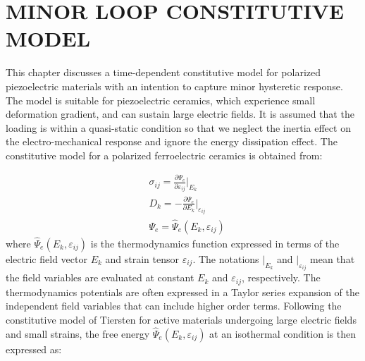 %
%
%


\chapter{\uppercase{minor loop constitutive model}}  
\label{section:minor_loop_constitutive_model_for_polarized_piezo_electric}
This chapter discusses a time-dependent constitutive model for polarized piezoelectric materials with an intention to capture minor hysteretic response.
The model is suitable for piezoelectric ceramics, which experience small deformation gradient, and can sustain large electric fields. 
It is assumed that the loading is within a quasi-static condition so that we neglect the inertia effect on the electro-mechanical response and ignore the energy dissipation effect. 
The constitutive model for a polarized ferroelectric ceramics is obtained from:


\begin{equation}
\begin{aligned}
&\sigma _{ij} = \frac{\partial \Psi_e}{\partial \varepsilon_{ij}}\vert _{E_{k}}
\\
& D_k = -\frac{\partial \Psi_e}{\partial E_k}\vert _{\varepsilon_{ij}}\\
& \Psi_e= \hat{\Psi}_e(E_k,\varepsilon_{ij})
\end{aligned}
\label{EQN:Derivation_from_gibbs}
\end{equation}
where $\hat{\Psi}_e(E_k,\varepsilon_{ij})$ is the thermodynamics function expressed in terms of the electric field vector $E_k$ and strain tensor $\varepsilon_{ij}$. 
The notations $\vert _{E_{k}}$ and $\vert _{\varepsilon_{ij}}$ mean that the field variables are evaluated at constant $E_{k}$ and $\varepsilon_{ij}$, respectively.
The thermodynamics potentials are often expressed in a Taylor series expansion of the independent field variables that can include higher order terms. 
Following the constitutive model of Tiersten \cite{tiersten1993electroelastic}
for active materials undergoing large electric fields and small strains, 
the free energy $\hat{\Psi}_e(E_k,\varepsilon_{ij})$ at an isothermal condition is then expressed as:

